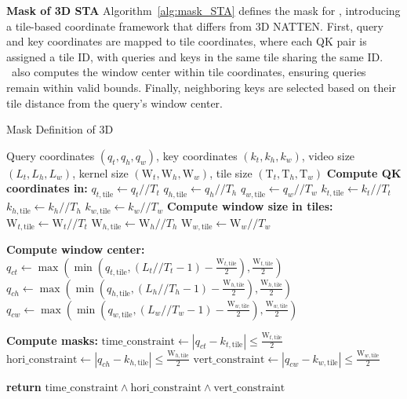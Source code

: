 \textbf{Mask of 3D STA}
Algorithm~\ref{alg:mask_STA} defines the mask for \methodnameshort, introducing a tile-based coordinate framework that differs from 3D NATTEN. First, query and key coordinates are mapped to tile coordinates, where each QK pair is assigned a tile ID, with queries and keys in the same tile sharing the same ID. \methodnameshort~also computes the window center within tile coordinates, ensuring queries remain within valid bounds. Finally, neighboring keys are selected based on their tile distance from the query’s window center.
\begin{algorithm}[h]
\caption{Mask Definition of 3D \methodnameshort}
\label{alg:mask_STA}
\begin{algorithmic}
\REQUIRE Query coordinates $(q_t, q_h, q_w)$, key coordinates $(k_t, k_h, k_w)$, video size $(L_t, L_h, L_w)$, kernel size $(\text{W}_t, \text{W}_h, \text{W}_w)$, tile size $(\text{T}_t, \text{T}_h, \text{T}_w)$ 
\STATE \textbf{Compute QK coordinates in:}
\STATE $q_{t,\text{tile}} \gets q_t // T_t$
\STATE $q_{h,\text{tile}} \gets q_h // T_h$
\STATE $q_{w,\text{tile}} \gets q_w // T_w$
\STATE $k_{t,\text{tile}} \gets k_t // T_t$
\STATE $k_{h,\text{tile}} \gets k_h // T_h$
\STATE $k_{w,\text{tile}} \gets k_w // T_w$
\STATE \textbf{Compute window size in tiles:}
\STATE $\text{W}_{t,\text{tile}} \gets \text{W}_t // T_t$
\STATE $\text{W}_{h,\text{tile}} \gets \text{W}_h // T_h$
\STATE $\text{W}_{w,\text{tile}} \gets \text{W}_w // T_w$

\STATE \textbf{Compute window center:}
\STATE $q_{ct} \gets \max\left(\min\left(q_{t,\text{tile}}, (L_t // T_t - 1) - \frac{\text{W}_{t,\text{tile}}}{2}\right), \frac{\text{W}_{t,\text{tile}}}{2} \right)$
\STATE $q_{ch} \gets \max\left(\min\left(q_{h,\text{tile}}, (L_h // T_h - 1) - \frac{\text{W}_{h,\text{tile}}}{2}\right), \frac{\text{W}_{h,\text{tile}}}{2} \right)$
\STATE $q_{cw} \gets \max\left(\min\left(q_{w,\text{tile}}, (L_w // T_w - 1) - \frac{\text{W}_{w,\text{tile}}}{2}\right), \frac{\text{W}_{w,\text{tile}}}{2} \right)$

\STATE \textbf{Compute masks:}
\STATE $\text{time\_constraint} \gets |q_{ct} - k_{t,\text{tile}}| \leq \frac{\text{W}_{t,\text{tile}}}{2}$
\STATE $\text{hori\_constraint} \gets |q_{ch} - k_{h,\text{tile}}| \leq \frac{\text{W}_{h,\text{tile}}}{2}$
\STATE $\text{vert\_constraint} \gets |q_{cw} - k_{w,\text{tile}}| \leq \frac{\text{W}_{w,\text{tile}}}{2}$

\STATE \textbf{return} $\text{time\_constraint} \land \text{hori\_constraint} \land \text{vert\_constraint}$
\end{algorithmic}
\end{algorithm}


